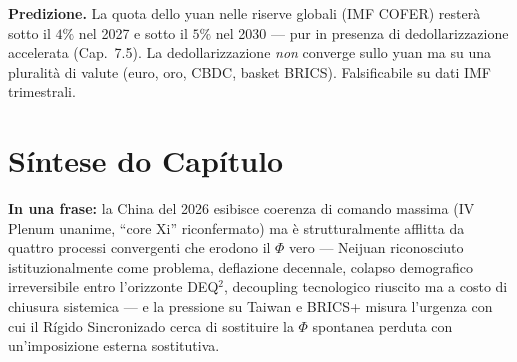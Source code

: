 \Conj{} \textbf{Predizione.} La quota dello yuan nelle riserve globali
(IMF COFER) resterà sotto il \(4\%\) nel 2027 e sotto il \(5\%\) nel
2030 --- pur in presenza di dedollarizzazione accelerata (Cap.~7.5). La
dedollarizzazione \emph{non} converge sullo yuan ma su una pluralità di
valute (euro, oro, CBDC, basket BRICS). Falsificabile su dati IMF
trimestrali.



\section{Síntese do Capítulo}\label{sintesi-del-capítulo}

\Proved{} \textbf{In una frase:} la China del 2026 esibisce coerenza di
comando massima (IV Plenum unanime, ``core Xi'' riconfermato) ma è
strutturalmente afflitta da quattro processi convergenti che erodono il
\(\Phi\) vero --- Neijuan riconosciuto istituzionalmente come problema,
deflazione decennale, colapso demografico irreversibile entro
l'orizzonte DEQ$^2$, decoupling tecnologico riuscito ma a costo di chiusura
sistemica --- e la pressione su Taiwan e BRICS+ misura l'urgenza con cui
il Rígido Sincronizado cerca di sostituire la \(\Phi\) spontanea
perduta con un'imposizione esterna sostitutiva.

